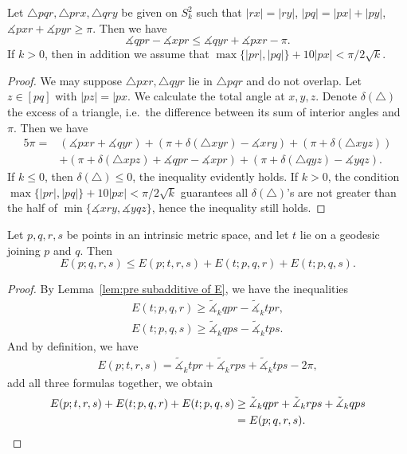 \begin{lem}\label{lem:pre subadditive of E}
    Let $\triangle{pqr},\triangle{prx},\triangle{qry}$ be given on $S^2_k$ such that $|rx|=|ry|$, $|pq|=|px|+|py|$, $\measuredangle{pxr}+\measuredangle{pyr}\geq\pi$.
    Then we have
    \[\measuredangle{qpr}-\measuredangle{xpr}\leq\measuredangle{qyr}+\measuredangle{pxr}-\pi.\]
    If $k>0$, then in addition we assume that $\max\{|pr|,|pq|\}+10|px|<\pi/2\sqrt{k}$.
\end{lem}
\begin{proof}
    We may suppose $\triangle{pxr},\triangle{qyr}$ lie in $\triangle{pqr}$ and do not overlap.
    Let $z\in[pq]$ with $|pz|=|px$.
    We calculate the total angle at $x,y,z$.
    Denote $\delta(\triangle)$ the excess of a triangle, i.e.\ the difference between its sum of interior angles and $\pi$.
    Then we have
    \begin{align*}
        5\pi=&(\measuredangle{pxr}+\measuredangle{qyr})+(\pi+\delta(\triangle{xyr})-\measuredangle{xry})+(\pi+\delta(\triangle{xyz}))\\
        &+(\pi+\delta(\triangle{xpz})+\measuredangle{qpr}-\measuredangle{xpr})+(\pi+\delta(\triangle{qyz})-\measuredangle{yqz}).
    \end{align*}
    If $k\leq 0$, then $\delta(\triangle)\leq 0$, the inequality evidently holds.
    If $k>0$, the condition $\max\{|pr|,|pq|\}+10|px|<\pi/2\sqrt{k}$ guarantees all $\delta(\triangle)$'s are not greater than the half of $\min\{\measuredangle{xry},\measuredangle{yqz}\}$, hence the inequality still holds.
\end{proof}

\begin{lem}\label{lem:subadditive of E}
    Let $p,q,r,s$ be points in an intrinsic metric space, and let $t$ lie on a geodesic joining $p$ and $q$.
    Then
    \[E(p;q,r,s)\leq E(p;t,r,s)+E(t;p,q,r)+E(t;p,q,s).\]
\end{lem}
\begin{proof}
    By Lemma~\ref{lem:pre subadditive of E}, we have the inequalities
    \begin{gather*}
        E(t;p,q,r)\geq\tilde{\measuredangle}_kqpr-\tilde{\measuredangle}_ktpr,\\
        E(t;p,q,s)\geq\tilde{\measuredangle}_kqps-\tilde{\measuredangle}_ktps.
    \end{gather*}
    And by definition, we have
    \begin{gather*}
        E(p;t,r,s)=\tilde{\measuredangle}_ktpr+\tilde{\measuredangle}_krps+\tilde{\measuredangle}_ktps-2\pi,
    \end{gather*}
    add all three formulas together, we obtain
    \begin{align*}
        E(p;t,r,s)+E(t;p,q,r)+E(t;p,q,s)&\geq\tilde{\measuredangle}_kqpr+\tilde{\measuredangle}_krps+\tilde{\measuredangle}_kqps\\
        &=E(p;q,r,s).\qedhere
    \end{align*}
\end{proof}


